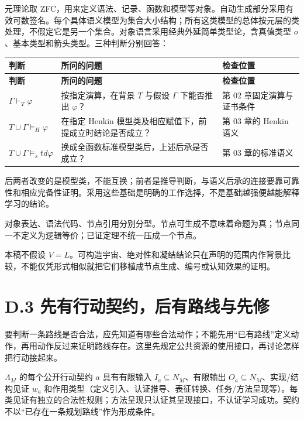 \documentclass[UTF8,a4paper,zihao=-4,fontset=windows,openany]{ctexbook}
\def\mathrm#1{#1}%
\begin{document}
元理论取 ZFC，用来定义语法、记录、函数和模型等对象。自动生成部分采用有效可数签名。每个具体语义模型为集合大小结构；所有这类模型的总体按元层的类处理，不假定它是另一个集合。对象语言采用经典外延简单类型论，含真值类型 \(o\)、基本类型和箭头类型。三种判断分别回答：

\begingroup\small\setlength{\tabcolsep}{4pt}
\begin{longtable}{>{\raggedright\arraybackslash}p{}>{\raggedright\arraybackslash}p{}>{\raggedright\arraybackslash}p{}}
\toprule
\textbf{判断} & \textbf{所问的问题} & \textbf{检查位置} \\
\midrule
\endfirsthead
\toprule
\textbf{判断} & \textbf{所问的问题} & \textbf{检查位置} \\
\midrule
\endhead
\bottomrule
\endfoot
\bottomrule
\endlastfoot
\(\Gamma\vdash_T \varphi\) & 按指定演算，在背景 \(T\) 与假设 \(\Gamma\) 下能否推出 \(\varphi\)？ & 第 02 章固定演算与证书条件 \\
\(T\cup\Gamma\vDash_H \varphi\) & 在指定 Henkin 模型类及相应赋值下，前提成立时结论是否成立？ & 第 03 章的 Henkin 语义 \\
\(T\cup\Gamma\vDash_\mathrm{std} \varphi\) & 换成全函数标准模型类后，上述后承是否成立？ & 第 03 章的标准语义 \\
\end{longtable}
\endgroup

后两者改变的是模型类，不能互换；前者是推导判断，与语义后承的连接要靠可靠性和相应完备性证明。采用这些基础是明确的工作选择，不是基础越强便越能解释学习的结论。

对象表达、语法代码、节点引用分别分型。节点可生成不意味着命题为真；节点同一不定义为逻辑等价；已证定理不统一压成一个节点。

本稿不假设 \(V=L\)。可构造宇宙、绝对性和凝结结论只在声明的范围内作背景比较，不能仅凭形式相似就把它们移植成节点生成、编号或认知效果的证明。

\section{D.3 先有行动契约，后有路线与先修}
要判断一条路线是否合法，应先知道有哪些合法动作；不能先用“已有路线”定义动作，再用动作反过来证明路线存在。这里先规定公共资源的使用接口，再讨论怎样把行动接起来。

\(\Lambda_M\) 的每个公开行动契约 \(a\) 具有有限输入 \(I_a\subseteq N_M\)、有限输出 \(O_a\subseteq N_M\)、实现/结构见证 \(w_a\) 和作用类型（定义引入、认证推导、表征转换、任务/方法呈现等）。每类见证有独立的合法性规则；方法呈现只认证其呈现接口，不认证学习成功。契约不以“已存在一条规划路线”作为形成条件。
\end{document}
